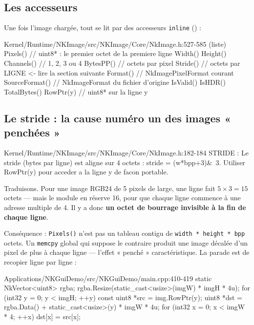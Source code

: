 \subsection{Les accesseurs}

Une fois l'image chargée, tout se lit par des accesseurs \texttt{inline}
() :

\begin{nkcode}{Kernel/Runtime/NKImage/src/NKImage/Core/NkImage.h:527-585 (liste)}
Pixels()       // uint8* : le premier octet de la premiere ligne
Width()  Height()
Channels()     // 1, 2, 3 ou 4
BytesPP()      // octets par pixel
Stride()       // octets par LIGNE  <- lire la section suivante
Format()       // NkImagePixelFormat courant
SourceFormat() // NkImageFormat du fichier d'origine
IsValid()  IsHDR()  TotalBytes()
RowPtr(y)      // uint8* sur la ligne y
\end{nkcode}

\subsection{Le stride : la cause numéro un des images « penchées »}

\begin{nkcode}{Kernel/Runtime/NKImage/src/NKImage/Core/NkImage.h:182-184}
 STRIDE :
   Le stride (bytes par ligne) est aligne sur 4 octets : stride = (w*bpp+3)&~3.
   Utiliser RowPtr(y) pour acceder a la ligne y de facon portable.
\end{nkcode}

Traduisons. Pour une image RGB24 de 5 pixels de large, une ligne fait
$5 \times 3 = 15$ octets — mais le module en réserve 16, pour que chaque ligne
commence à une adresse multiple de 4. Il y a donc \textbf{un octet de bourrage
invisible à la fin de chaque ligne}.

Conséquence : \texttt{Pixels()} n'est pas un tableau contigu de
\texttt{width * height * bpp} octets. Un \texttt{memcpy} global qui suppose le
contraire produit une image décalée d'un pixel de plus à chaque ligne — l'effet
« penché » caractéristique. La parade est de recopier ligne par ligne :

\begin{nkcode}{Applications/NKGuiDemo/src/NKGuiDemo/main.cpp:410-419}
            static NkVector<uint8> rgba;
            rgba.Resize(static_cast<usize>(imgW) * imgH * 4u);
            for (int32 y = 0; y < imgH; ++y) {
                const uint8 *src = img.RowPtr(y);
                uint8 *dst = rgba.Data() + static_cast<usize>(y) * imgW * 4u;
                for (int32 x = 0; x < imgW * 4; ++x)
                    dst[x] = src[x];
            }
\end{nkcode}

